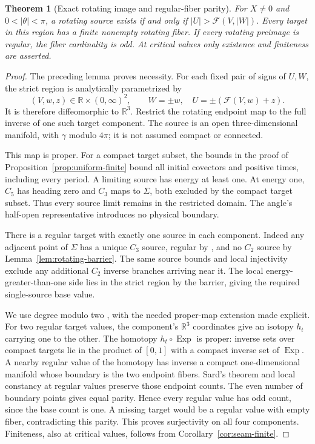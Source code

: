 \documentclass[11pt,a4paper]{article}
\newtheorem{theorem}{Theorem}[section]
\theoremstyle{remark}\newtheorem{remark}[theorem]{Remark}
\begin{document}
\begin{theorem}[Exact rotating image and regular-fiber parity]
\label{thm:rotating-image-parity}
For $X\ne0$ and $0<|\theta|<\pi$, a rotating source exists if and
only if $|U|>\mathcal F(V,|W|)$. Every target in this region has a
finite nonempty rotating fiber. If every rotating preimage is regular,
the fiber cardinality is odd. At critical values only existence and
finiteness are asserted.
\end{theorem}
\begin{proof}
The preceding lemma proves necessity. For each fixed pair of signs of
$U,W$, the strict region is analytically parametrized by
\[
 (V,w,z)\in\mathbb R\times(0,\infty)^2,
 \qquad W=\pm w,\quad U=\pm(\mathcal F(V,w)+z).
\]
It is therefore diffeomorphic to $\mathbb R^3$. Restrict the rotating
endpoint map to the full inverse of one such target component.
The source is an open three-dimensional manifold, with $\gamma$
modulo $4\pi$; it is not assumed compact or connected.

This map is proper. For a compact target subset, the bounds in the
proof of Proposition~\ref{prop:uniform-finite} bound all initial
covectors and positive times, including every period. A limiting
source has energy at least one. At energy one, $C_5$ has heading zero
and $C_3$ maps to $\Sigma$, both excluded by the compact target subset.
Thus every source limit remains in the restricted domain. The angle's
half-open representative introduces no physical boundary.

There is a regular target with exactly one source in each component.
Indeed any adjacent point of $\Sigma$ has a unique $C_3$ source,
regular by \cite[Theorem 2.4]{SC}, and no $C_2$ source by
Lemma~\ref{lem:rotating-barrier}. The same source bounds and local
injectivity exclude any additional $C_2$ inverse branches arriving
near it. The local energy-greater-than-one side lies in the strict
region by the barrier, giving the required single-source base value.

We use degree modulo two \cite[Section 4]{Milnor}, with the needed
proper-map extension made explicit. For two regular target values,
the component's $\mathbb R^3$ coordinates give an isotopy $h_t$
carrying one to the other. The homotopy $h_t\circ\operatorname{Exp}$
is proper: inverse sets over compact targets lie in the product of
$[0,1]$ with a compact inverse set of $\operatorname{Exp}$.
A nearby regular value of the homotopy has inverse a compact
one-dimensional manifold whose boundary is the two endpoint fibers.
Sard's theorem and local constancy at regular values preserve those
endpoint counts. The even number of boundary points gives equal
parity. Hence every regular value has odd count, since the base count
is one. A missing target would be a regular value with empty fiber,
contradicting this parity. This proves surjectivity on all four
components. Finiteness, also at critical values, follows from
Corollary~\ref{cor:seam-finite}.
\end{proof}
\end{document}
